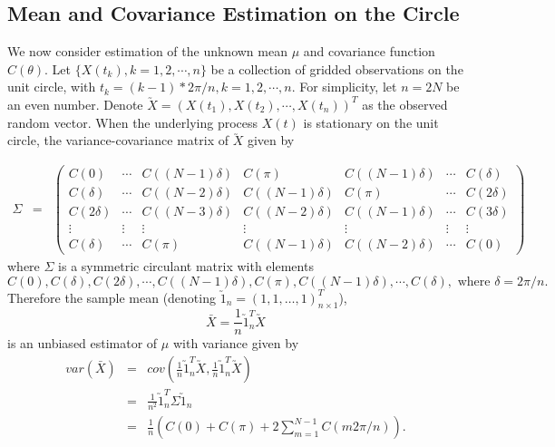 \subsection{Mean and Covariance Estimation on the Circle}

We now consider estimation of the unknown mean $\mu$ and covariance function $C(\theta)$. Let $\{X(t_k), k = 1, 2, \cdots, n\}$ be a collection of gridded observations on the unit circle, with $t_k = (k-1)*2\pi/n, k = 1, 2, \cdots, n$. For simplicity, let $n = 2N$ be an even number. Denote $\utilde{X} = (X(t_1), X(t_2), \cdots, X(t_n))^T$ as the observed random vector. When the underlying process $X(t)$ is stationary on the unit circle, the variance-covariance matrix of $\utilde{X}$ given by

\begin{eqnarray*}
	\Sigma &=& \left(\begin{array}{ccccccc}
	C(0)      & \cdots & C((N-1)\delta ) & C(\pi) &  C((N-1)\delta ) & \cdots & C(\delta) \\
	C(\delta) & \cdots & C((N-2)\delta) & C((N-1)\delta) &  C(\pi)  & \cdots & C(2\delta) \\
	C(2\delta) & \cdots & C((N-3)\delta) & C((N-2)\delta) &  C((N-1)\delta) & \cdots & C(3\delta)\\
	\vdots    & \vdots  & \vdots  & \vdots  & \vdots  & \vdots  & \vdots  \\
	C(\delta) & \cdots & C(\pi) &  C((N-1)\delta) & C((N-2)\delta)  & \cdots & C(0)
	\end{array} \right)
\end{eqnarray*}
where $\Sigma$ is a symmetric circulant matrix with elements
\[
C(0),C(\delta), C(2\delta), \cdots, C((N-1)\delta), C(\pi),  C((N-1)\delta), \cdots, C(\delta), \mbox{ where } \delta = 2\pi/n.
\]
Therefore the sample mean (denoting $\utilde{1}_n = (1,1,\dots,1)_{n\times 1}^{T}$), 
\[
\bar{X} = \frac{1}{n}\utilde{1}_n^T \utilde{X}
\]
is an unbiased estimator of $\mu$ with variance given by
\begin{eqnarray*}
var(\bar{X}) &=& cov\left(\frac{1}{n}\utilde{1}_n^T \utilde{X}, \frac{1}{n}\utilde{1}_n^T \utilde{X}\right) \nonumber \\
	&=& \frac{1}{n^2}\utilde{1}_n^T \Sigma \utilde{1}_n \nonumber \\
	&=& \frac{1}{n} \left(C(0)+C(\pi)+2 \sum_{m=1}^{N-1}C(m 2\pi/n)\right). \nonumber
\end{eqnarray*}

